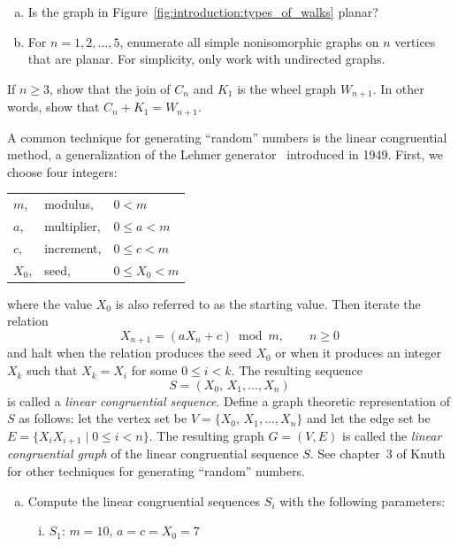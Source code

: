\begin{problem}
\begin{enumerate}[(a)]
  \item Is the graph in Figure~\ref{fig:introduction:types_of_walks}
    planar?

  \item For $n = 1, 2, \dots, 5$, enumerate all simple nonisomorphic
    graphs on $n$ vertices that are planar. For simplicity, only work
    with undirected graphs.
  \end{enumerate}

\item If $n \geq 3$, show that the join of $C_n$ and $K_1$ is the
  wheel graph $W_{n+1}$. In other words, show that $C_n + K_1 = W_{n+1}$.

\item A common technique for generating ``random'' numbers is the
  linear congruential method, a generalization of the Lehmer
  generator~\cite{Lehmer1949} introduced in 1949. First, we choose
  four integers:
  \begin{center}
  \begin{tabular}{lll}
  $m$,   & modulus,    & $0 < m$ \\[4pt]
  $a$,   & multiplier, & $0 \leq a < m$ \\[4pt]
  $c$,   & increment,  & $0 \leq c < m$ \\[4pt]
  $X_0$, & seed,       & $0 \leq X_0 < m$
  \end{tabular}
  \end{center}
  where the value $X_0$ is also referred to as the starting
  value. Then iterate the relation
  \[
  X_{n+1}
  =
  (a X_n + c) \bmod m,\qquad n \geq 0
  \]
  and halt when the relation produces the seed $X_0$ or when it
  produces an integer $X_k$ such that $X_k = X_i$ for some
  $0 \leq i < k$. The resulting sequence
  \[
  S
  =
  (X_0,\, X_1, \dots, X_n)
  \]
  is called a \emph{linear congruential sequence}. Define a graph
  theoretic representation of $S$ as follows: let the vertex set be
  $V = \{X_0,\, X_1, \dots, X_n\}$ and let the edge set be
  $E = \{X_i X_{i+1} \mid 0 \leq i < n\}$. The resulting graph
  $G = (V,E)$ is called the \emph{linear congruential graph} of the
  linear congruential sequence $S$. See chapter~3 of
  Knuth~\cite{Knuth1998b} for other techniques for generating
  ``random'' numbers.
  \begin{enumerate}[(a)]
  \item Compute the linear congruential sequences $S_i$ with the
    following parameters:
    \begin{enumerate}[(i)]
    \item $S_1$: $m = 10$, $a = c = X_0 = 7$


\end{enumerate}
\end{enumerate}
\end{problem}

